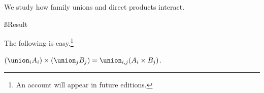 


We study how family unions and direct products interact.

\ss{Result}

The following is easy.\footnote{An account will appear in future editions.}

\begin{proposition}
  $(\union_{i} A_i) \times (\union_j B_j) = \union_{i, j} (A_i \times B_j)$.
\end{proposition}

\blankpage
